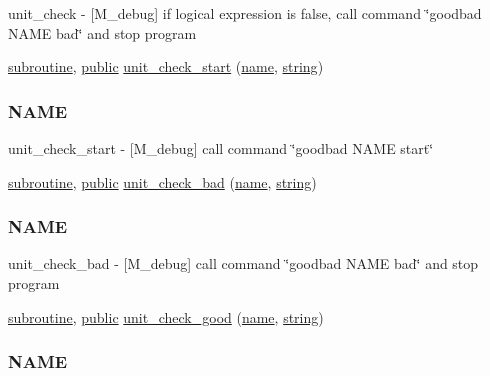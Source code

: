 \begin{DoxyCompactItemize}
\begin{DoxyCompactList}
unit\+\_\+check -\/ \mbox{[}M\+\_\+debug\mbox{]} if logical expression is false, call command \char`\"{}goodbad N\+A\+M\+E bad\char`\"{} and stop program \end{DoxyCompactList}\item 
\hyperlink{M__stopwatch_83_8txt_acfbcff50169d691ff02d4a123ed70482}{subroutine}, \hyperlink{M__stopwatch_83_8txt_a2f74811300c361e53b430611a7d1769f}{public} \hyperlink{namespacem__debug_a6f1166b1f25f39931359c1aa1b2219e5}{unit\+\_\+check\+\_\+start} (\hyperlink{M__stopwatch_83_8txt_a3f508a893ae4c3b397b4383e33b9bcae}{name}, \hyperlink{what__overview_81_8txt_a74cb7e955273b9f9157b4f0c18a38849}{string})
\begin{DoxyCompactList}\small\item\em \subsubsection*{N\+A\+ME}

unit\+\_\+check\+\_\+start -\/ \mbox{[}M\+\_\+debug\mbox{]} call command \char`\"{}goodbad N\+A\+M\+E start\char`\"{} \end{DoxyCompactList}\item 
\hyperlink{M__stopwatch_83_8txt_acfbcff50169d691ff02d4a123ed70482}{subroutine}, \hyperlink{M__stopwatch_83_8txt_a2f74811300c361e53b430611a7d1769f}{public} \hyperlink{namespacem__debug_a668813eec59e4c16d3bbc2d317e8cdee}{unit\+\_\+check\+\_\+bad} (\hyperlink{M__stopwatch_83_8txt_a3f508a893ae4c3b397b4383e33b9bcae}{name}, \hyperlink{what__overview_81_8txt_a74cb7e955273b9f9157b4f0c18a38849}{string})
\begin{DoxyCompactList}\small\item\em \subsubsection*{N\+A\+ME}

unit\+\_\+check\+\_\+bad -\/ \mbox{[}M\+\_\+debug\mbox{]} call command \char`\"{}goodbad N\+A\+M\+E bad\char`\"{} and stop program \end{DoxyCompactList}\item 
\hyperlink{M__stopwatch_83_8txt_acfbcff50169d691ff02d4a123ed70482}{subroutine}, \hyperlink{M__stopwatch_83_8txt_a2f74811300c361e53b430611a7d1769f}{public} \hyperlink{namespacem__debug_acd67428a8900ec4c36bd3a7b28d56987}{unit\+\_\+check\+\_\+good} (\hyperlink{M__stopwatch_83_8txt_a3f508a893ae4c3b397b4383e33b9bcae}{name}, \hyperlink{what__overview_81_8txt_a74cb7e955273b9f9157b4f0c18a38849}{string})
\begin{DoxyCompactList}\small\item\em \subsubsection*{N\+A\+ME}


\end{DoxyCompactList}
\end{DoxyCompactItemize}
